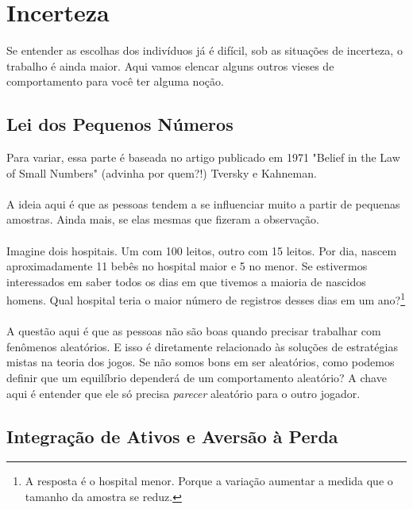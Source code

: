 \documentclass[a4paper,11pt,oneside]{book}
\theoremstyle{definition}
\theoremstyle{break}
\begin{document}
\section{Incerteza}

Se entender as escolhas dos indivíduos já é difícil, sob as situações de incerteza, o trabalho é ainda maior. Aqui vamos elencar alguns outros vieses de comportamento para você ter alguma noção.

\subsection{Lei dos Pequenos Números}

Para variar, essa parte é baseada no artigo publicado em 1971 "Belief in the Law of Small Numbers" (advinha por quem?!) Tversky e Kahneman.
\\~\\
A ideia aqui é que as pessoas tendem a se influenciar muito a partir de pequenas amostras. Ainda mais, se elas mesmas que fizeram a observação.
\\~\\
Imagine dois hospitais. Um com 100 leitos, outro com 15 leitos. Por dia, nascem aproximadamente 11 bebês no hospital maior e 5 no menor. Se estivermos interessados em saber todos os dias em que tivemos a maioria de nascidos homens. Qual hospital teria o maior número de registros desses dias em um ano?\footnote{A resposta é o hospital menor. Porque a variação aumentar a medida que o tamanho da amostra se reduz.}
\\~\\
A questão aqui é que as pessoas não são boas quando precisar trabalhar com fenômenos aleatórios. E isso é diretamente relacionado às soluções de estratégias mistas na teoria dos jogos. Se não somos bons em ser aleatórios, como podemos definir que um equilíbrio dependerá de um comportamento aleatório? A chave aqui é entender que ele só precisa \textit{parecer} aleatório para o outro jogador.


\subsection{Integração de Ativos e Aversão à Perda}
\end{document}
